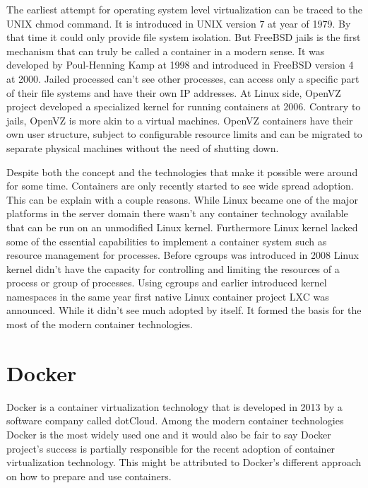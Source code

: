 \documentclass[12pt,oneandhalf,chaparabic,ceng,ms,eng,oneside,pntc]{gsufbe}
\begin{document}
The earliest attempt for operating system level virtualization can be traced to the UNIX chmod command.
It is introduced in UNIX version 7 at year of 1979. By that time it could only provide file system
isolation. But FreeBSD jails is the first mechanism that can truly be called a container in a modern
sense. It was developed by Poul-Henning Kamp at 1998 and introduced in FreeBSD version 4 at 2000.
Jailed processed can't see other processes, can access only a specific part of their file systems and
have their own IP addresses. At Linux side, OpenVZ project developed a specialized kernel for running
containers at 2006. Contrary to jails, OpenVZ is more akin to a virtual machines. OpenVZ containers
have their own user structure, subject to configurable resource limits and can be migrated to separate
physical machines without the need of shutting down.

Despite both the concept and the technologies that make it possible were around for some time.
Containers are only recently started to see wide spread adoption. This can be explain with a couple
reasons. While Linux became one of the major platforms in the server domain there wasn't any container
technology available that can be run on an unmodified Linux kernel. Furthermore Linux kernel lacked
some of the essential capabilities to implement a container system such as resource management for
processes. Before cgroups was introduced in 2008 Linux kernel didn't have the capacity for controlling
and limiting the resources of a process or group of processes. Using cgroups and earlier introduced
kernel namespaces in the same year first native Linux
container project LXC was announced. While it didn't see much adopted by itself. It formed the basis
for the most of the modern container technologies.

\section{Docker}
Docker is a container virtualization technology that is developed in 2013 by a software company called
dotCloud. Among the modern container technologies Docker is the most widely used one and it would also
be fair to say Docker project's success is partially responsible for the recent adoption of container
virtualization technology. This might be attributed to Docker's different approach on how to prepare 
and use containers.
\end{document}
